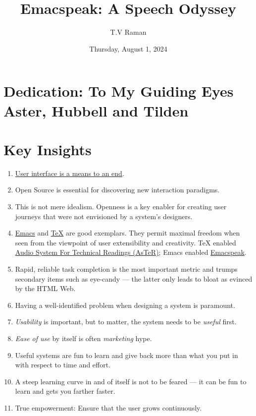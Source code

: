 \documentclass[11pt]{article}
\author{T.V Raman}
\date{Thursday, August 1, 2024}
\title{Emacspeak:  A Speech Odyssey}
\begin{document}
\maketitle
\section{Dedication: To My Guiding Eyes Aster, Hubbell and Tilden}
\label{sec:orgf4510c7}
\section{Key Insights}
\label{sec:org46eb760}
\begin{enumerate}
\item \href{https://www.drdobbs.com:443/user-interface-a-means-to-an-end/184410453}{User interface is a means to an end}.
\item Open Source is essential  for discovering new interaction paradigms.
\item This is not mere idealism.  Openness is a key enabler for
creating   user journeys that were not  envisioned by a 
system's designers.
\item \href{https://www.gnu.org/s/emacs/}{Emacs} and  \href{https://en.wikipedia.org/wiki/TeX}{\TeX{}}    are good exemplars. They  permit maximal freedom
 when seen from the viewpoint of user extensibility and
creativity. \TeX{} enabled \href{https://emacspeak.blogspot.com/2022/12/aster-spoken-math-on-emacspeak-audio\_21.html}{Audio System For Technical Readings (AsTeR)}; Emacs enabled \href{https://emacspeak.sourceforge.net}{Emacspeak}.
\item Rapid, reliable task completion is the most important metric and
trumps secondary items such as eye-candy --- the latter only
leads to bloat as evinced by the HTML Web.
\item Having a well-identified  problem when designing a system
is paramount.
\item \emph{Usability} is important, but to   matter, the
system needs to be \emph{useful} first.
\item \emph{Ease of use} by   itself is often \emph{marketing} hype.
\item Useful systems are fun to learn and give back more than what you put
in with respect to time and effort.
\item A steep learning curve in and of itself is not to be feared --- it
can be fun to learn and  gets you farther faster.
\item True empowerment: Ensure that the user grows continuously.
\end{enumerate}
\end{document}
